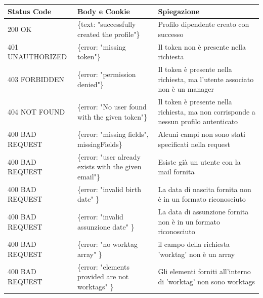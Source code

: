 \documentclass{report}
\begin{document}
		\begin{center} %
			\centering
			\begin{tabular}{ |p{4cm}|p{5cm}|p{4cm}| }
				\hline
				\centering Status Code & \qquad\quad Body e Cookie                                & \qquad\qquad Spiegazione                              \\ %
				\hline
				200 OK                 & \{text: "successfully created the profile"\} 			  & Profilo dipendente creato con successo                           \\
				\hline
				401 UNAUTHORIZED       & \{error: "missing token"\} 							  & Il token non è presente nella richiesta				  \\
				\hline
				403 FORBIDDEN		   & \{error: "permission denied"\}							  & Il token è presente nella richiesta, ma l'utente associato non è un manager \\	
				\hline
				404 NOT FOUND 		   & \{error: "No user found with the given token"\}          & Il token è presente nella richiesta, ma non corrisponde a nessun profilo autenticato \\
				\hline
				400 BAD REQUEST        & \{error: "missing fields", missingFields\}               & Alcuni campi non sono stati specificati nella request \\ %
				\hline
				400 BAD REQUEST        & \{error: "user already exists with the given email"\}    & Esiste già un utente con la mail fornita              \\%
				\hline
				400 BAD REQUEST        & \{error: "invalid birth date" \}                            & La data di nascita fornita non è in un formato riconosciuto             \\
				\hline
				400 BAD REQUEST        & \{error: "invalid assunzione date" \}                            & La data di assunzione fornita non è in un formato riconosciuto             \\
				\hline
				400 BAD REQUEST        & \{error: "no worktag array" \}                            & il campo della richiesta 'worktag' non è un array           \\
				\hline
				400 BAD REQUEST        & \{error: "elements provided are not worktags" \}                            & Gli elementi forniti all'interno di 'worktag' non sono worktags           \\
				\hline
			\end{tabular}
		\end{center}
\end{document}
